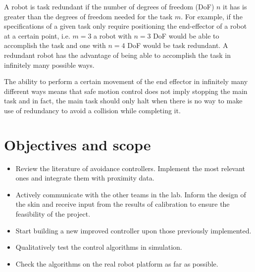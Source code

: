 A robot is task redundant if the number of degrees of freedom (DoF) $n$ it has is greater than the degrees of freedom needed for the task $m$. For example, if the specifications of a given task only require positioning the end-effector of a robot at a certain point, i.e. $m = 3$ a robot with $n = 3$ DoF would be able to accomplish the task and one with $n = 4$ DoF would be task redundant. A redundant robot has the advantage of being able to accomplish the task in infinitely many possible ways.

The ability to perform a certain movement of the end effector in infinitely many different ways means that safe motion control does not imply stopping the main task and in fact, the main task should only halt when there is no way to make use of redundancy to avoid a collision while completing it.

\section{Objectives and scope}

\begin{itemize}
    \item Review the literature of avoidance controllers. Implement the most relevant ones and integrate them with proximity data.
    \item Actively communicate with the other teams in the lab. Inform the design of the skin and receive input from the results of calibration to ensure the feasibility of the project.
    \item Start building a new improved controller upon those previously implemented.
    \item Qualitatively test the control algorithms in simulation.
    \item Check the algorithms on the real robot platform as far as possible.
\end{itemize}